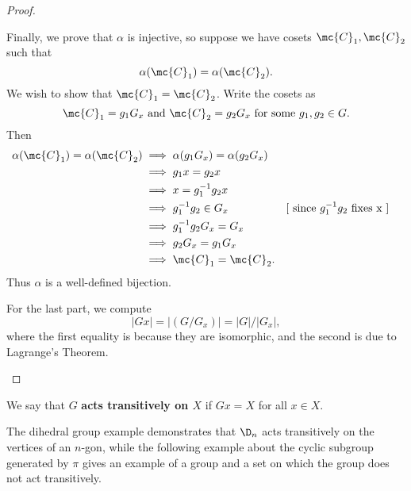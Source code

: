 \documentclass[math1530-lecture-notes]{subfiles}
\begin{document}
\begin{proof}[Proof]
\begin{enumerate}
      Finally, we prove that $\alpha$ is injective, so suppose we have cosets $\mc{C}_1, \mc{C}_2$
      such that \[
        \alpha(\mc{C}_1)=\alpha(\mc{C}_2)
      .\] We wish to show that $\mc{C}_1=\mc{C}_2$. Write the cosets as \[
        \mc{C}_1=g_1G_x~\text{and}~\mc{C}_2=g_2G_x~\text{for some}~g_1,g_2\in G
      .\] Then
      \begin{align*}
        \alpha(\mc{C}_1)=\alpha(\mc{C}_2)&\implies \alpha(g_1G_x)=\alpha(g_2G_x)\\
                                         &\implies g_1x=g_2x\\
                                         &\implies x=g_1^{-1}g_2x\\
                                         &\implies g_1^{-1}g_2\in G_x&&[~\text{since $g_1^{-1}g_2$
                                         fixes x}~]\\
                                         &\implies g_1^{-1}g_2G_x=G_x\\
                                         &\implies g_2G_x=g_1G_x\\
                                         &\implies \mc{C}_1=\mc{C}_2
      .\end{align*} Thus $\alpha$ is a well-defined bijection.

      For the last part, we compute \[
        \left| Gx \right| =\left| (G / G_x) \right| =\left| G \right| /\left| G_x \right| 
      ,\] where the first equality is because they are isomorphic, and the second is due to
      Lagrange's Theorem.
  \end{enumerate}
\end{proof}

\begin{definition}[Transitivity]{}
  We say that $G$ \textbf{acts transitively on $X$} if $Gx=X$ for all $x\in X$.
\end{definition}

The dihedral group example demonstrates that $\D_n$ acts transitively on the vertices of an $n$-gon,
while the following example about the cyclic subgroup generated by $\pi$ gives an example of a group
and a set on which the group does not act transitively.
\end{document}

